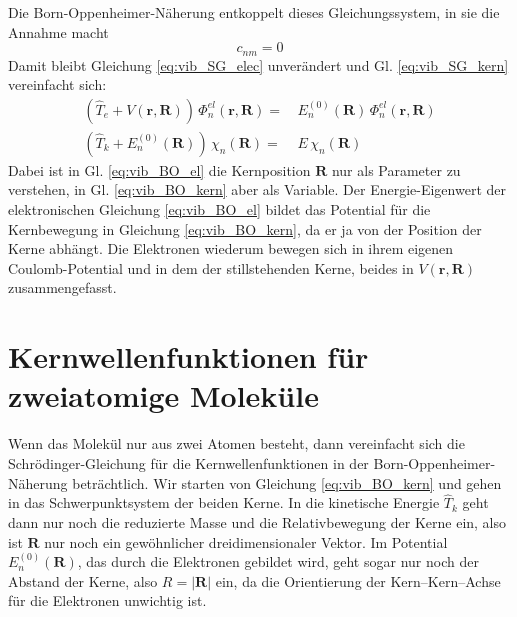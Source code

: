 Die Born-Oppenheimer-Näherung entkoppelt dieses Gleichungssystem, in sie die Annahme macht
\begin{equation}
c_{n m } = 0
\end{equation}
Damit bleibt Gleichung \ref{eq:vib_SG_elec} unverändert und Gl. \ref{eq:vib_SG_kern} vereinfacht sich:
\begin{align}
\left( \hat{T}_e + V (\mathbf{r}, \mathbf{R}) \right) \, \Phi_n^{el}  (\mathbf{r}, \mathbf{R})  = &  \, E_n^{(0)}  (\mathbf{R})  \, \Phi_n^{el}  (\mathbf{r}, \mathbf{R})    \label{eq:vib_BO_el}\\
\left( \hat{T}_k + E_n^{(0)}(\mathbf{R})  \right) \, \chi_n (\mathbf{R}) =  &   \, E  \, \chi_n (\mathbf{R})   \label{eq:vib_BO_kern}
\end{align}
Dabei ist in Gl. \ref{eq:vib_BO_el} die Kernposition $\mathbf{R}$ nur als Parameter zu verstehen, in Gl. \ref{eq:vib_BO_kern} aber als Variable. Der Energie-Eigenwert der elektronischen Gleichung \ref{eq:vib_BO_el}  bildet das Potential für die Kernbewegung in Gleichung  \ref{eq:vib_BO_kern}, da er ja von der Position der Kerne abhängt. Die Elektronen wiederum bewegen sich in ihrem eigenen Coulomb-Potential und in dem der stillstehenden Kerne, beides in 
$V (\mathbf{r}, \mathbf{R}) $ zusammengefasst.


\section{Kernwellenfunktionen für zweiatomige Moleküle}

Wenn das Molekül nur aus zwei Atomen besteht, dann vereinfacht sich die Schrödinger-Gleichung für die Kernwellenfunktionen in der Born-Oppenheimer-Näherung beträchtlich. Wir starten von Gleichung \ref{eq:vib_BO_kern} und gehen in das Schwerpunktsystem der beiden Kerne. In die kinetische Energie $\hat{T}_k$ geht dann nur noch die reduzierte Masse und die Relativbewegung der Kerne ein, also ist $\mathbf{R}$ nur noch ein gewöhnlicher dreidimensionaler Vektor. Im Potential $ E_n^{(0)}(\mathbf{R})  $, das durch die Elektronen gebildet wird, geht sogar nur noch der Abstand der Kerne, also $R = |\mathbf{R}| $ ein, da die Orientierung der Kern--Kern--Achse für die Elektronen unwichtig ist. 

